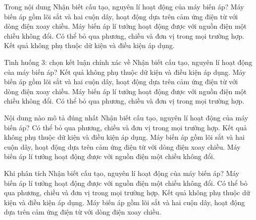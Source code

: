 \begin{ex}
Trong nội dung Nhận biết cấu tạo, nguyên lí hoạt động của máy biến áp?
\choice
{\True Máy biến áp gồm lõi sắt và hai cuộn dây, hoạt động dựa trên cảm ứng điện từ với dòng điện xoay chiều.}
{Máy biến áp lí tưởng hoạt động được với nguồn điện một chiều không đổi.}
{Có thể bỏ qua phương, chiều và đơn vị trong mọi trường hợp.}
{Kết quả không phụ thuộc dữ kiện và điều kiện áp dụng.}
\end{ex}

\begin{ex}
Tình huống 3: chọn kết luận chính xác về Nhận biết cấu tạo, nguyên lí hoạt động của máy biến áp?
\choice
{Kết quả không phụ thuộc dữ kiện và điều kiện áp dụng.}
{\True Máy biến áp gồm lõi sắt và hai cuộn dây, hoạt động dựa trên cảm ứng điện từ với dòng điện xoay chiều.}
{Máy biến áp lí tưởng hoạt động được với nguồn điện một chiều không đổi.}
{Có thể bỏ qua phương, chiều và đơn vị trong mọi trường hợp.}
\end{ex}

\begin{ex}
Nội dung nào mô tả đúng nhất Nhận biết cấu tạo, nguyên lí hoạt động của máy biến áp?
\choice
{Có thể bỏ qua phương, chiều và đơn vị trong mọi trường hợp.}
{Kết quả không phụ thuộc dữ kiện và điều kiện áp dụng.}
{\True Máy biến áp gồm lõi sắt và hai cuộn dây, hoạt động dựa trên cảm ứng điện từ với dòng điện xoay chiều.}
{Máy biến áp lí tưởng hoạt động được với nguồn điện một chiều không đổi.}
\end{ex}

\begin{ex}
Khi phân tích Nhận biết cấu tạo, nguyên lí hoạt động của máy biến áp?
\choice
{Máy biến áp lí tưởng hoạt động được với nguồn điện một chiều không đổi.}
{Có thể bỏ qua phương, chiều và đơn vị trong mọi trường hợp.}
{Kết quả không phụ thuộc dữ kiện và điều kiện áp dụng.}
{\True Máy biến áp gồm lõi sắt và hai cuộn dây, hoạt động dựa trên cảm ứng điện từ với dòng điện xoay chiều.}
\end{ex}

